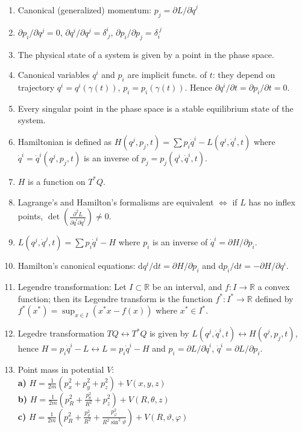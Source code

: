 \documentclass{article}
\newcommand{\R}{\mathbb{R}}
\renewcommand\d{\mathrm d}
\begin{document}
\begin{multicols}{3}
        \begin{enumerate}
            \item Canonical (generalized) momentum: $p_j=\partial L/\partial\dot q^j$
            \item $\partial p_i/\partial q^j=0$, $\partial q^i/\partial q^j=\delta_{~j}^i$, $\partial p_i/\partial p_j=\delta_i^{~j}$
            \item The physical state of a system is given by a point in the phase space.
            \item Canonical variables $q^i$ and $p_i$ are implicit functs. of $t$: they depend on trajectory $q^i=q^i(\gamma(t))$, $p_i=p_i(\gamma(t))$. Hence $\partial q^i/\partial t=\partial p_i/\partial t= 0$.
            \item Every singular point in the phase space is a stable equilibrium state of the system.
            \item Hamiltonian is defined as $H(q^j,p_j,t)=\sum p_i\dot q^i-L(q^j,\dot q^i, t)$ where $\dot q^i=\dot q^i(q^j,p_j,t)$ is an inverse of $p_j=p_j(q^i, \dot q^i, t)$.
            \item $H$ is a function on $T^*Q$.
            \item Lagrange's and Hamilton's formalisms are equivalent $\Leftrightarrow$ if $L$ has no inflex points, $\det\left(\frac{\partial^2 L}{\partial\dot q^i\partial\dot q^j}\right)\neq 0$.
            \item $L(q^j,\dot q^j,t)=\sum p_i\dot q^i-H$ where $p_i$ is an inverse of $\dot q^i=\partial H/\partial p_i$.
            \item Hamilton's canonical equations: $\d q^i/\d t=\partial H/\partial p_i$ and $\d p_i/\d t=-\partial H/\partial q^i$.
            \item Legendre transformation: Let $I\subset\R$ be an interval, and $f:I\to\R$ a convex function; then its Legendre transform is the function $f^*:I^*\to\R$ defined by $f^*(x^*)=\sup_{x\in I}(x^*x-f(x))$ where $x^*\in I^*$.
            \item Legedre transformation $TQ\leftrightarrow T^*Q$ is given by $L(q^j,\dot q^i, t)\leftrightarrow H(q^j,p_j,t)$, hence $H=p_i\dot q^i-L\leftrightarrow L=p_i\dot q^i-H$ and $p_i=\partial L/\partial\dot q^i$, $\dot q^i=\partial L/\partial p_i$.
            \item Point mass in potential $V$:\\\textbf{a)} $H=\frac{1}{2m}(p_x^2+p_y^2+p_z^2)+V(x,y,z)$\\\textbf{b)} $H=\frac{1}{2m}(p_R^2+\frac{p_\theta^2}{R^2}+p_z^2)+V(R,\theta,z)$\\\textbf{c)} $H=\frac{1}{2m}(p_R^2+\frac{p_\vartheta^2}{R^2}+\frac{p_\varphi^2}{R^2\sin^2\vartheta})+V(R,\vartheta,\varphi)$

\end{enumerate}
\end{multicols}
\end{document}
